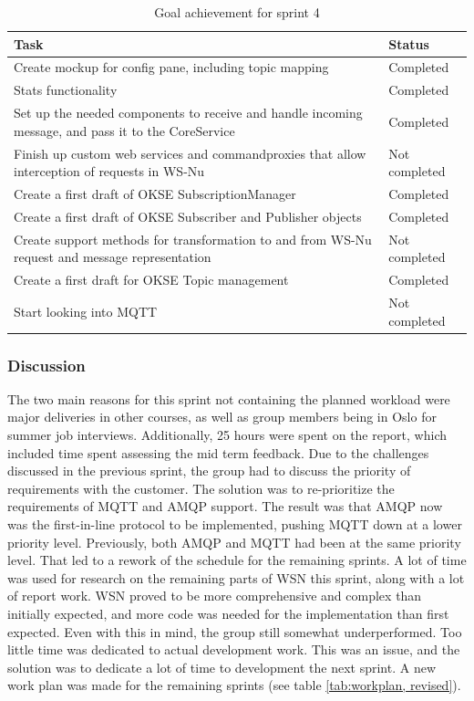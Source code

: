 \begin{table}[ht!]
\small
\centering
\begin{tabular}{ | p{10cm} | p{2cm} |}
\hline
 \rowcolor{lightgray}
 \textbf{Task} & \textbf{Status} \\
\hline
\rowcolor{green!30}
Create mockup for config pane, including topic mapping & Completed \\
\rowcolor{green!30}
Stats functionality	& Completed \\
\rowcolor{green!30}
Set up the needed components to receive and handle incoming message, and pass it to the CoreService	& Completed \\
\rowcolor{orange!40}
Finish up custom web services and commandproxies that allow interception of requests in WS-Nu	& Not completed \\
\rowcolor{green!30}
Create a first draft of OKSE SubscriptionManager & Completed \\
\rowcolor{green!30}
Create a first draft of OKSE Subscriber and Publisher objects & Completed \\
\rowcolor{orange!40}
Create support methods for transformation to and from WS-Nu request and message representation	& Not completed \\
\rowcolor{green!30}
Create a first draft for OKSE Topic management & Completed \\
\rowcolor{orange!40}
Start looking into MQTT	& Not completed \\
\hline
\end{tabular}
\caption{Goal achievement for sprint 4}
\label{tab:sprint 4, goals}
\end{table}


\subsubsection{Discussion}
\label{subsec:project_lifecycle-development-sprint_4-discussion}

The two main reasons for this sprint not containing the planned workload were major deliveries in other courses, as well as group members being in Oslo for summer job interviews. Additionally, 25 hours were spent on the report, which included time spent assessing the mid term feedback. Due to the challenges discussed in the previous sprint, the group had to discuss the priority of requirements with the customer. The solution was to re-prioritize the requirements of MQTT and AMQP support. The result was that AMQP now was the first-in-line protocol to be implemented, pushing MQTT down at a lower priority level. Previously, both AMQP and MQTT had been at the same priority level. That led to a rework of the schedule for the remaining sprints. A lot of time was used for research on the remaining parts of WSN this sprint, along with a lot of report work. WSN proved to be more comprehensive and complex than initially expected, and more code was needed for the implementation than first expected. Even with this in mind, the group still somewhat underperformed. Too little time was dedicated to actual development work. This was an issue, and the solution was to dedicate a lot of time to development the next sprint. A new work plan was made for the remaining sprints (see table \ref{tab:workplan, revised}).

